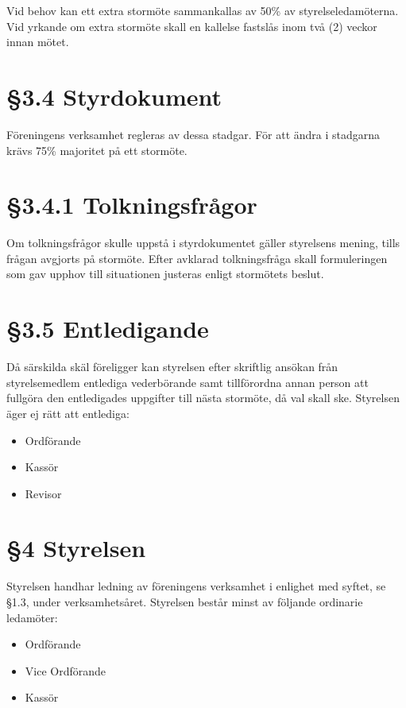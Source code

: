 \documentclass[]{article}
\providecommand{\tightlist}{%
  \setlength{\itemsep}{0pt}\setlength{\parskip}{0pt}}
\begin{document}
Vid behov kan ett extra stormöte sammankallas av 50\% av
styrelseledamöterna. Vid yrkande om extra stormöte skall en kallelse
fastslås inom två (2) veckor innan mötet.

\section{§3.4 Styrdokument}\label{styrdokument}

Föreningens verksamhet regleras av dessa stadgar. För att ändra i
stadgarna krävs 75\% majoritet på ett stormöte.

\section{§3.4.1 Tolkningsfrågor}\label{tolkningsfruxe5gor}

Om tolkningsfrågor skulle uppstå i styrdokumentet gäller styrelsens
mening, tills frågan avgjorts på stormöte. Efter avklarad tolkningsfråga
skall formuleringen som gav upphov till situationen justeras enligt
stormötets beslut.

\section{§3.5 Entledigande}\label{entledigande}

Då särskilda skäl föreligger kan styrelsen efter skriftlig ansökan från
styrelsemedlem entlediga vederbörande samt tillförordna annan person att
fullgöra den entledigades uppgifter till nästa stormöte, då val skall
ske. Styrelsen äger ej rätt att entlediga:

\begin{itemize}
\tightlist
\item
  Ordförande
\item
  Kassör
\item
  Revisor
\end{itemize}

\section{§4 Styrelsen}\label{styrelsen}

Styrelsen handhar ledning av föreningens verksamhet i enlighet med
syftet, se §1.3, under verksamhetsåret. Styrelsen består minst av
följande ordinarie ledamöter:

\begin{itemize}
\tightlist
\item
  Ordförande
\item
  Vice Ordförande
\item
  Kassör
\end{itemize}
\end{document}
